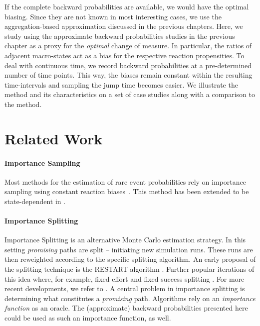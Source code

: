 If the complete backward probabilities are available, we would have the optimal biasing.
Since they are not known in most interesting cases, we use the aggregation-based approximation discussed in the previous chapters.
Here, we study using the approximate backward probabilities studies in the previous chapter as a proxy for the \emph{optimal} change of measure.
In particular, the ratios of adjacent macro-states act as a bias for the respective reaction propensities.
To deal with continuous time, we record backward probabilities at a pre-determined number of time points.
This way, the biases remain constant within the resulting time-intervals and sampling the jump time becomes easier.
We illustrate the method and its characteristics on a set of case studies along with a comparison to the  method.


\section{Related Work}
\paragraph{Importance Sampling}
Most methods for the estimation of rare event probabilities  rely on  importance sampling using constant reaction biases~\parencite{kuwahara2008efficient,daigle2011automated,chong2017path}.
This method has been extended to be state-dependent in \citet{roh2011state}.

\paragraph{Importance Splitting}
Importance Splitting is an alternative Monte Carlo estimation strategy.
In this setting \emph{promising} paths are split -- initiating new simulation runs.
These runs are then reweighted according to the specific splitting algorithm.
An early proposal of the splitting technique is the \ac{RESTART} algorithm \parencite{villen1994restart}.
Further popular iterations of this idea where, for example, fixed effort and fixed success splitting \parencite{garvels1998comparison}.
For more recent developments, we refer to \parencite{budde2017better,jegourel2013importance}.
A central problem in importance splitting is determining what constitutes a \emph{promising} path.
Algorithms rely on an \emph{importance function} as an oracle.
The (approximate) backward probabilities presented here could be used as such an importance function, as well.

